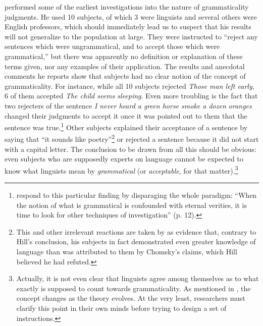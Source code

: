 \citet{Hill1961} performed some of the earliest investigations into the nature of grammaticality judgments. He used 10 subjects, of which 3 were linguists and several others were English professors, which should immediately lead us to suspect that his results will not generalize to the population at large. They were instructed to ``reject any sentences which were ungrammatical, and to accept those which were grammatical,'' but there was apparently no definition or explanation of these terms given, nor any examples of their application. The results and anecdotal comments he reports show  that subjects had no clear notion of the concept of grammaticality. For instance, while all 10 subjects rejected \textit{Those man left early}, 6 of them accepted \textit{The child seems sleeping}. Even more troubling is the
fact that two rejecters of the sentence \textit{I never heard a green horse smoke a dozen oranges} changed their judgments to accept it once it was pointed out to them that the sentence was true.\footnote{\citet{QuirkEtAl1966} respond to this particular finding by disparaging the whole paradigm: ``When the notion of what is grammatical is confounded with eternal verities, it is time to look for other techniques of investigation'' (p. 12).}
 Other subjects explained their acceptance of a sentence by saying that ``it sounds like poetry''\footnote{This and other irrelevant reactions are taken by \citet{Lees1976} as evidence that, contrary to Hill's conclusion, his subjects in fact demonstrated even greater knowledge of language than was attributed to them by Chomsky's claims, which Hill believed he had refuted.}
or rejected a sentence because it did not start with a capital letter. The conclusion to be drawn from all this should be obvious: even subjects who are supposedly experts on language cannot be expected to know what linguists mean by \textit{grammatical} (or \textit{acceptable}, for that matter).\footnote{Actually, it is not even clear that linguists agree among themselves as to what exactly is supposed to count towards grammaticality. As mentioned in , the concept changes as the theory evolves. At the very least, researchers must clarify this point in their own minds before trying to design a set of instructions.}
